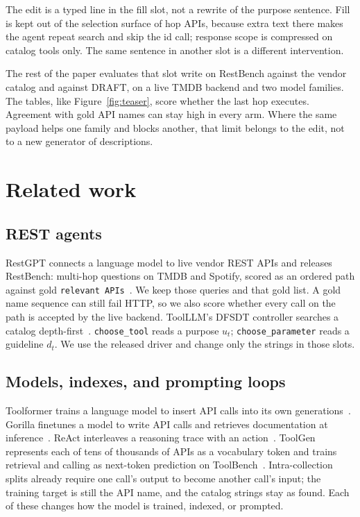 \documentclass[11pt,a4paper]{article}
\begin{document}
The edit is a typed line in the fill slot, not a rewrite of the purpose sentence. Fill is kept out of the selection surface of hop APIs, because extra text there makes the agent repeat search and skip the id call; response scope is compressed on catalog tools only. The same sentence in another slot is a different intervention.

The rest of the paper evaluates that slot write on RestBench against the vendor catalog and against DRAFT, on a live TMDB backend and two model families. The tables, like Figure~\ref{fig:teaser}, score whether the last hop executes. Agreement with gold API names can stay high in every arm. Where the same payload helps one family and blocks another, that limit belongs to the edit, not to a new generator of descriptions.

\section{Related work}

\subsection*{REST agents}
RestGPT connects a language model to live vendor REST APIs and releases RestBench: multi-hop questions on TMDB and Spotify, scored as an ordered path against gold \texttt{relevant APIs}~\cite{song2023restgpt}. We keep those queries and that gold list. A gold name sequence can still fail HTTP, so we also score whether every call on the path is accepted by the live backend. ToolLLM's DFSDT controller searches a catalog depth-first~\cite{qin2024toollm}. \texttt{choose\_tool} reads a purpose $u_t$; \texttt{choose\_parameter} reads a guideline $d_t$. We use the released driver and change only the strings in those slots.

\subsection*{Models, indexes, and prompting loops}
Toolformer trains a language model to insert API calls into its own generations~\cite{schick2023toolformer}. Gorilla finetunes a model to write API calls and retrieves documentation at inference~\cite{patil2024gorilla}. ReAct interleaves a reasoning trace with an action~\cite{yao2023react}. ToolGen represents each of tens of thousands of APIs as a vocabulary token and trains retrieval and calling as next-token prediction on ToolBench~\cite{wang2025toolgen}. Intra-collection splits already require one call's output to become another call's input; the training target is still the API name, and the catalog strings stay as found. Each of these changes how the model is trained, indexed, or prompted.
\end{document}
